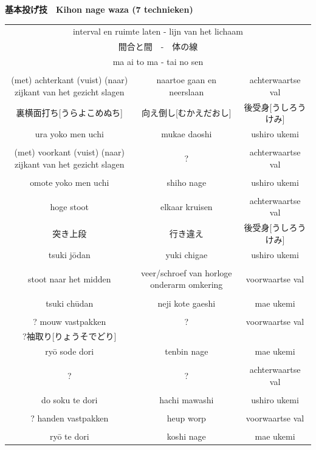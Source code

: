 \documentclass[12pt]{scrartcl}
\begin{document}
\begin{CJK*}{UTF8}{min}
\newpage
\begin{landscape}
\thispagestyle{empty} %
\begin{center}
    \textbf{基本投げ技　Kihon nage waza (7 technieken)}
\end{center}
\begin{table}[H]
\begin{center}
\scriptsize
\begin{tabular}{ccc}
\multicolumn{3}{c}{interval en ruimte laten - lijn van het lichaam}\\
\multicolumn{3}{c}{間合と間　-　体の線}\\
\multicolumn{3}{c}{ma ai to ma - tai no sen}\\
\\
(met) achterkant (vuist) (naar) zijkant van het gezicht slagen & naartoe gaan en neerslaan & achterwaartse val\\
裏横面打ち[うらよこめぬち] & 向え倒し[むかえだおし] & 後受身[うしろうけみ]\\
ura yoko men uchi & mukae daoshi & ushiro ukemi\\
\\
(met) voorkant (vuist) (naar) zijkant van het gezicht slagen & ? & achterwaartse val\\
\\
omote yoko men uchi & shiho nage & ushiro ukemi\\
\\
hoge stoot & elkaar kruisen & achterwaartse val\\
突き上段 & 行き違え & 後受身[うしろうけみ]\\
tsuki j\={o}dan & yuki chigae & ushiro ukemi\\
\\
stoot naar het midden & veer/schroef van horloge onderarm omkering & voorwaartse val\\
\\
tsuki ch\={u}dan & neji kote gaeshi & mae ukemi\\
\\
? mouw vastpakken & ? & voorwaartse val\\
?袖取り[りょうそでどり]  &   &   \\
ry\={o} sode dori & tenbin nage & mae ukemi\\
\\
? & ? & achterwaartse val\\
\\
do soku te dori & hachi mawashi & ushiro ukemi\\
\\
? handen vastpakken & heup worp & voorwaartse val\\
\\
ry\={o} te dori & koshi nage & mae ukemi
\end{tabular}
\end{center}
\label{kihonnagewaza}
\end{table}
\end{landscape}


\end{CJK*}
\end{document}
